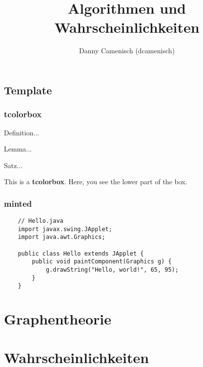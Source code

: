 \documentclass[a4paper]{report}
\title{Algorithmen und Wahrscheinlichkeiten}
\author{Danny Camenisch (dcamenisch)}
\begin{document}
\maketitle
\tableofcontents
\listofalgorithms



\chapter{Template}
\section{tcolorbox}

\begin{definition}
    Definition...
\end{definition}

\begin{lemma}
    Lemma...
\end{lemma}

\begin{satz}
    Satz...
\end{satz}

\begin{tcolorbox}[colback=dcWhite,colframe=dcOrange,title=\textbf{My Heading}]
    This is a \textbf{tcolorbox}.
\tcblower
    Here, you see the lower part of the box.
\end{tcolorbox}

\section{minted}

\begin{verbatim}
    // Hello.java
    import javax.swing.JApplet;
    import java.awt.Graphics;
    
    public class Hello extends JApplet {
        public void paintComponent(Graphics g) {
            g.drawString("Hello, world!", 65, 95);
        }    
    }
\end{verbatim}



\part{Graphentheorie}








\part{Wahrscheinlichkeiten}

\end{document}
